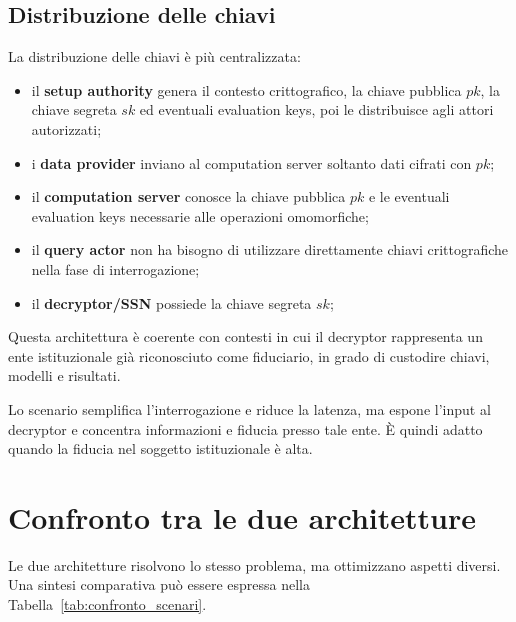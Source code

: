\subsection{Distribuzione delle chiavi}
La distribuzione delle chiavi \`e pi\`u centralizzata:
\begin{itemize}
  \item il \textbf{setup authority} genera il contesto crittografico, la chiave pubblica $pk$, la chiave segreta $sk$ ed eventuali evaluation keys, poi le distribuisce agli attori autorizzati;
  \item i \textbf{data provider} inviano al computation server soltanto dati cifrati con $pk$;
  \item il \textbf{computation server} conosce la chiave pubblica $pk$ e le eventuali evaluation keys necessarie alle operazioni omomorfiche;
  \item il \textbf{query actor} non ha bisogno di utilizzare direttamente chiavi crittografiche nella fase di interrogazione;
  \item il \textbf{decryptor/SSN} possiede la chiave segreta $sk$;
\end{itemize}

Questa architettura \`e coerente con contesti in cui il decryptor rappresenta un ente istituzionale gi\`a riconosciuto come fiduciario, in grado di custodire chiavi, modelli e risultati.

Lo scenario semplifica l'interrogazione e riduce la latenza, ma espone l'input al decryptor e concentra informazioni e fiducia presso tale ente. \`E quindi adatto quando la fiducia nel soggetto istituzionale \`e alta.

\section{Confronto tra le due architetture}
Le due architetture risolvono lo stesso problema, ma ottimizzano aspetti diversi. Una sintesi comparativa pu\`o essere espressa nella Tabella~\ref{tab:confronto_scenari}.

